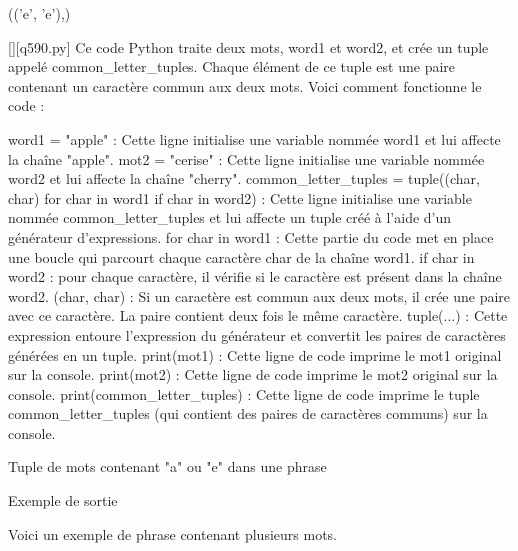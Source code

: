 (('e', 'e'),)
        \par
        \begin{solution}
            \renewcommand{\nomfichier}{q590.py}
            \pythonfile{\chemincode \nomfichier}[][\nomfichier]
            Ce code Python traite deux mots, word1 et word2, et crée un tuple appelé common\_letter\_tuples. Chaque élément de ce tuple est une paire contenant un caractère commun aux deux mots. Voici comment fonctionne le code :

    word1 = "apple" : Cette ligne initialise une variable nommée word1 et lui affecte la chaîne "apple".
    mot2 = "cerise" : Cette ligne initialise une variable nommée word2 et lui affecte la chaîne "cherry".
    common\_letter\_tuples = tuple((char, char) for char in word1 if char in word2) : Cette ligne initialise une variable nommée common\_letter\_tuples et lui affecte un tuple créé à l'aide d'un générateur d'expressions.
        for char in word1 : Cette partie du code met en place une boucle qui parcourt chaque caractère char de la chaîne word1.
        if char in word2 : pour chaque caractère, il vérifie si le caractère est présent dans la chaîne word2.
        (char, char) : Si un caractère est commun aux deux mots, il crée une paire avec ce caractère. La paire contient deux fois le même caractère.
        tuple(...) : Cette expression entoure l'expression du générateur et convertit les paires de caractères générées en un tuple.
    print(mot1) : Cette ligne de code imprime le mot1 original sur la console.
    print(mot2) : Cette ligne de code imprime le mot2 original sur la console.
    print(common\_letter\_tuples) : Cette ligne de code imprime le tuple common\_letter\_tuples (qui contient des paires de caractères communs) sur la console.
        \end{solution}
        

        \question
        Tuple de mots contenant "a" ou "e" dans une phrase

Exemple de sortie

Voici un exemple de phrase contenant plusieurs mots.

